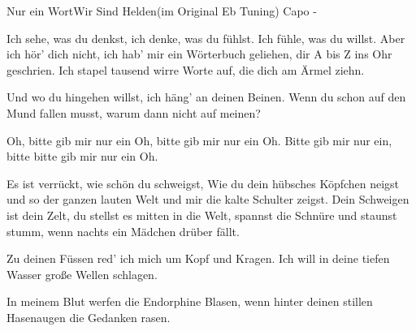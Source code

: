 \begin{song}{Nur ein Wort}{Wir Sind Helden}{(im Original Eb Tuning) Capo -}


Ich sehe, was du denkst, ich denke, was du fühlst.
Ich fühle, was du willst. Aber ich hör' dich nicht, ich
hab' mir ein Wörterbuch geliehen, dir A bis Z ins Ohr geschrien.
Ich stapel tausend wirre Worte auf, die dich am Ärmel ziehn.

Und wo du hingehen willst, ich häng' an deinen Beinen.
Wenn du schon auf den Mund fallen musst, warum dann nicht auf meinen?

Oh, bitte gib mir nur ein Oh, bitte gib mir nur ein Oh.
Bitte gib mir nur ein, bitte bitte gib mir nur ein Oh.


Es ist verrückt, wie schön du schweigst,
Wie du dein hübsches Köpfchen neigst
und so der ganzen lauten Welt und mir die kalte Schulter zeigst.
Dein Schweigen ist dein Zelt, du stellst es mitten in die Welt,
spannst die Schnüre und staunst stumm, 
wenn nachts ein Mädchen drüber fällt.

Zu deinen Füssen red' ich mich um Kopf und Kragen.
Ich will in deine tiefen Wasser große Wellen schlagen.

 


In meinem Blut werfen die Endorphine Blasen,
wenn hinter deinen stillen Hasenaugen die Gedanken rasen.


\end{song}
